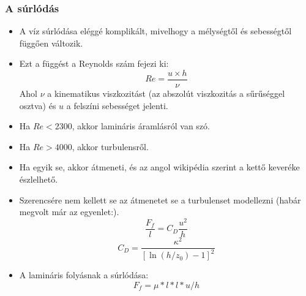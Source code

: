 \documentclass{beamer}
\begin{document}
	\begin{frame}[allowframebreaks]
		\frametitle{A súrlódás}
		\begin{itemize}
			\item A víz súrlódása eléggé komplikált, mivelhogy a mélységtől és sebességtől függően változik.
			\item Ezt a függést a Reynolds szám fejezi ki:
			\begin{equation}
				Re=\frac{u \times h}{\nu}
			\end{equation}
			Ahol $\nu$ a kinematikus viszkozitást (az abszolút viszkozitás a sűrűséggel osztva) és $u$ a felszíni sebességet jelenti.
			\item Ha $Re < 2300$, akkor lamináris áramlásról van szó. 
			\item Ha $Re > 4000$, akkor turbulensről.
			\item Ha egyik se, akkor átmeneti, és az angol wikipédia szerint a kettő keveréke észlelhető.
		\end{itemize}
		\begin{itemize}
			\item Szerencsére nem kellett se az átmenetet se a turbulenset modellezni (habár megvolt már az egyenlet:).
				\begin{equation}
					\frac{F_f}{l}=C_D\frac{u^2}{h}
				\end{equation}
				\begin{equation}
					C_D=\frac{\kappa^2}{[\ln(h/z_0)-1]^2}
                \end{equation}
			\item A lamináris folyásnak a súrlódása:
                \begin{equation}
                    F_f=\mu*l*l*u/h
                \end{equation}
		\end{itemize}
	\end{frame}
\end{document}

